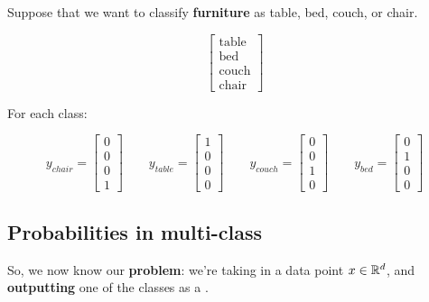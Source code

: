         \miniex Suppose that we want to classify \textbf{furniture} as table, bed, couch, or chair.
        
        \begin{equation}
            \begin{bmatrix}
              \text{table} \\ \text{bed} \\ \text{couch} \\ \text{chair} 
            \end{bmatrix}
        \end{equation}
        
        For each class:
        
        \begin{equation}
            y_{chair} = 
            \begin{bmatrix}
              0\\0\\0\\1
            \end{bmatrix}
            \qquad
            y_{table} = 
            \begin{bmatrix}
              1\\0\\0\\0
            \end{bmatrix}
            \qquad
            y_{couch} = 
            \begin{bmatrix}
              0\\0\\1\\0
            \end{bmatrix}
            \qquad
            y_{bed} = 
            \begin{bmatrix}
              0\\1\\0\\0
            \end{bmatrix}
        \end{equation}
        
    \subsection{Probabilities in multi-class}
    
        So, we now know our \textbf{problem}: we're taking in a data point $x \in \mathbb R^d$, and \textbf{outputting} one of the classes as a .
        
